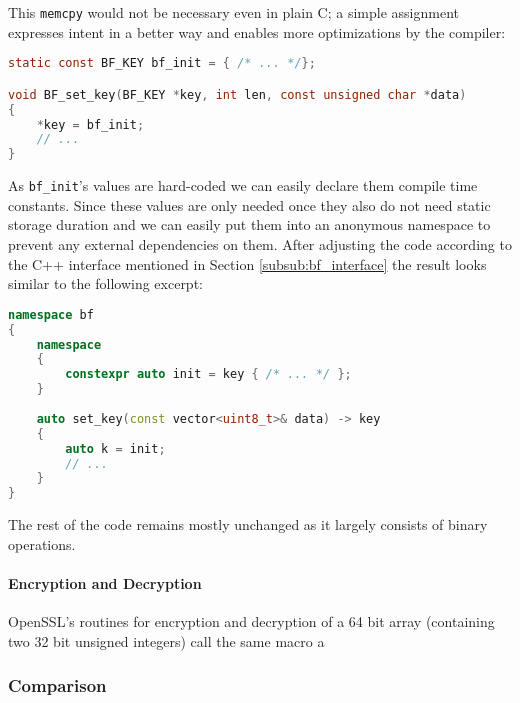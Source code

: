 This \texttt{memcpy} would not be necessary even in plain C; a simple assignment expresses intent in a better way and enables more optimizations by the compiler:

\begin{lstlisting}[language=C]
static const BF_KEY bf_init = { /* ... */};

void BF_set_key(BF_KEY *key, int len, const unsigned char *data)
{
    *key = bf_init;
    // ...
}
\end{lstlisting}

As \texttt{bf\_init}'s values are hard-coded we can easily declare them compile time constants. Since these values are only needed once they also do not need static storage duration and we can easily put them into an anonymous namespace to prevent any external dependencies on them. After adjusting the code according to the C++ interface mentioned in Section \ref{subsub:bf_interface} the result looks similar to the following excerpt:

\begin{lstlisting}[language=C++]
namespace bf
{
    namespace
    {
        constexpr auto init = key { /* ... */ };
    }
    
    auto set_key(const vector<uint8_t>& data) -> key
    {
        auto k = init;
        // ...
    }
}
\end{lstlisting}

The rest of the code remains mostly unchanged as it largely consists of binary operations.

\paragraph{Encryption and Decryption}

OpenSSL's routines for encryption and decryption of a 64 bit array (containing two 32 bit unsigned integers) call the same macro a 

\subsubsection{Comparison}